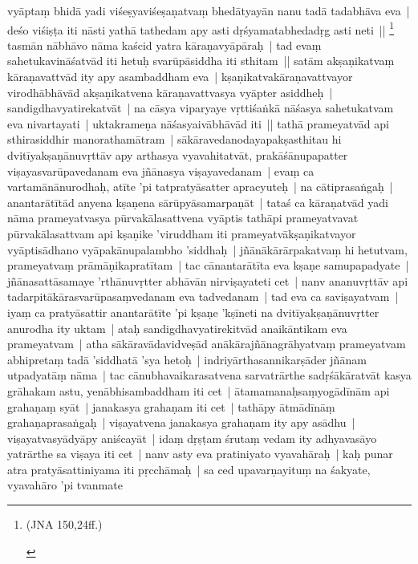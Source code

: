 \documentclass[article,a4paper]{memoir}
\begin{document}
	  \pstart vyā\-ptaṃ bhidā\- yadi viśeṣyaviśeṣaṇatvaṃ bhedā\-tyayā\-n nanu tadā\- tadabhā\-va eva | deśo viśiṣṭa iti nā\-sti yathā\- tathedam apy asti dṛśyamatabhedadṛg asti neti || \footnote{\begin{english}(JNA 150,24ff.)\end{english}} \label{thakur75-124.8} tasmā\-n nā\-bhā\-vo nā\-ma kaścid yatra kā\-raṇavyā\-pā\-raḥ | tad evaṃ sahetukavinā\-śatvā\-d iti hetuḥ svarū\-pā\-siddha iti sthitam || \label{thakur75-124.10} satā\-m akṣaṇikatvaṃ kā\-raṇavattvā\-d ity apy asambaddham eva | kṣaṇikatvakā\-raṇavattvayor virodhā\-bhā\-vā\-d akṣaṇikatvena kā\-raṇavattvasya vyā\-pter asiddheḥ | sandigdhavyatirekatvā\-t | na cā\-sya viparyaye vṛttiśaṅkā\- nā\-śasya sahetukatvam eva nivartayati | uktakrameṇa nā\-śasyaivā\-bhā\-vā\-d iti || \label{thakur75-124.14} tathā\- prameyatvā\-d api sthirasiddhir manorathamā\-tram | sā\-kā\-ravedanodayapakṣasthitau hi dvitī\-yakṣaṇā\-nuvṛttā\-v apy arthasya vyavahitatvā\-t, prakā\-śā\-nupapatter viṣayasvarū\-pavedanam eva jñā\-nasya viṣayavedanam | evaṃ ca vartamā\-nā\-nurodhaḥ, atī\-te 'pi tatpratyā\-satter apracyuteḥ | na cā\-tiprasaṅgaḥ | anantarā\-tī\-tā\-d anyena kṣaṇena sā\-rū\-pyā\-samarpaṇā\-t | tataś ca kā\-raṇatvā\-d yadi nā\-ma prameyatvasya pū\-rvakā\-lasattvena vyā\-ptis tathā\-pi prameyatvavat pū\-rvakā\-lasattvam api kṣaṇike 'viruddham iti prameyatvā\-kṣaṇikatvayor vyā\-ptisā\-dhano vyā\-pakā\-nupalambho 'siddhaḥ | jñā\-nā\-kā\-rā\-rpakatvaṃ hi hetutvam, prameyatvaṃ prā\-mā\-ṇikapratī\-tam | tac cā\-nantarā\-tī\-ta eva kṣaṇe samupapadyate | \label{thakur75-124.22} jñā\-nasattā\-samaye 'rthā\-nuvṛtter abhā\-vā\-n nirviṣayateti cet | \label{thakur75-124.22a} nanv ananuvṛttā\-v api tadarpitā\-kā\-rasvarū\-pasaṃvedanam eva tadvedanam | tad eva ca saviṣayatvam | iyaṃ ca pratyā\-sattir anantarā\-tī\-te 'pi kṣaṇe 'kṣī\-neti na dvitī\-yakṣaṇā\-nuvṛtter anurodha ity uktam | ataḥ sandigdhavyatirekitvā\-d anaikā\-ntikam eva prameyatvam | \label{thakur75-124.26} atha sā\-kā\-ravā\-davidveṣā\-d anā\-kā\-rajñā\-nagrā\-hyatvaṃ prameyatvam abhipretaṃ tadā\- 'siddhatā\- 'sya hetoḥ | \label{thakur75-124.27} indriyā\-rthasannikarṣā\-der jñā\-nam utpadyatā\-ṃ nā\-ma | \label{thakur75-124.27a} tac cā\-nubhavaikarasatvena sarvatrā\-rthe sadṛśā\-kā\-ratvā\-t kasya grā\-hakam astu, \label{thakur75-124.28} yenā\-bhisambaddham iti cet | \label{thakur75-124.28a} ā\-tamamanaḥsaṃyogā\-dī\-nā\-m api grahaṇaṃ syā\-t | \label{thakur75-124.29} janakasya grahaṇam iti cet | \label{thakur75-124.29a} tathā\-py ā\-tmā\-dī\-nā\-ṃ grahaṇaprasaṅgaḥ | viṣayatvena janakasya grahaṇam ity apy asā\-dhu | viṣayatvasyā\-dyā\-py aniścayā\-t | \label{thakur75-124.30} idaṃ dṛṣṭam śrutaṃ vedam ity adhyavasā\-yo yatrā\-rthe sa viṣaya iti cet | \label{thakur75-124.31} nanv asty eva pratiniyato vyavahā\-raḥ | kaḥ punar atra pratyā\-sattiniyama iti pṛcchā\-maḥ | sa ced upavarṇayituṃ na śakyate, vyavahā\-ro 'pi tvanmate 
\end{document}
